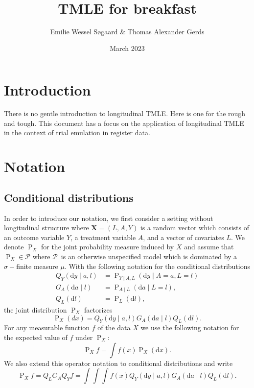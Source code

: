\documentclass{article}
\title{TMLE for breakfast}
\author{Emilie Wessel S{\o}gaard \& Thomas Alexander Gerds}
\date{March 2023}
\newcommand{\X}{X}
\newcommand{\modelx}{\ensuremath{\mathcal{P}}}
\newcommand{\distx}{\ensuremath{\P_{X}}}
\renewcommand{\X}{\ensuremath{\mathbf{X}}}
\renewcommand{\P}{\ensuremath{\operatorname{P}}}
\renewcommand{\d}{\ensuremath{\mathrm{d}}}
\begin{document}
\maketitle

\section{Introduction}

There is no gentle introduction to longitudinal TMLE. Here is one for
the rough and tough. This document has a focus on the application of
longitudinal TMLE in the context of trial emulation in register data.
\section{Notation}

\subsection{Conditional distributions}

In order to introduce our notation, we first consider a setting
without longitudinal structure where $\X=(L,A,Y)$ is a random vector
which consists of an outcome variable \(Y\), a treatment variable
\(A\), and a vector of covariates \(L\). We denote \(\distx\) for the
joint probability measure induced by \(X\) and assume that
$\P_X\in\modelx $ where \modelx\ is an otherwise unspecified model
which is dominated by a \(\sigma-\)finite measure $\mu$. With the
following notation for the conditional distributions
\begin{align*}
    Q_Y(\d y\mid a,l)&=\P_{Y\mid A, L}(\d y\mid A=a, L = l)\\
    G_A(\d a\mid l)&=\P_{A\mid L}(\d a\mid L = l),\\
    Q_L(\d l)&=\P_L(\d l),
\end{align*}
the joint distribution $\distx$ factorizes
\begin{equation*}\distx(dx)=Q_Y(\d y\mid a,l)G_A(\d a\mid l)Q_L(\d l).\end{equation*}
For any measurable function \(f\) of the data \(X\) we use the
following notation for the expected value of \(f\) under \(\distx\):
\begin{equation*}
\distx f=\int f(x)\distx(\d x). 
\end{equation*}
We also extend this operator notation to conditional
distributions and write
\begin{equation*}
\distx f=Q_LG_AQ_Yf=\int\int\int f(x)Q_Y(\d y\mid a,l)G_A(\d a\mid l)Q_L(\d l).
\end{equation*}
\end{document}
